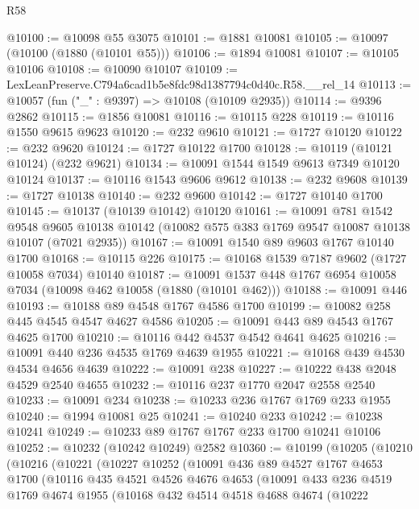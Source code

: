 \begin{lexlean}{R58}
\begin{coremodule}
@10100 := @10098 @55 @3075
@10101 := @1881 @10081
@10105 := @10097 (@10100 (@1880 (@10101 @55)))
@10106 := @1894 @10081
@10107 := @10105 @10106
@10108 := @10090 @10107
@10109 := LexLeanPreserve.C794a6cad1b5e8fdc98d1387794c0d40c.R58.__rel_14
@10113 := @10057 (fun ("_" : @9397) => @10108 (@10109 @2935))
@10114 := @9396 @2862
@10115 := @1856 @10081
@10116 := @10115 @228
@10119 := @10116 @1550 @9615 @9623
@10120 := @232 @9610
@10121 := @1727 @10120
@10122 := @232 @9620
@10124 := @1727 @10122 @1700
@10128 := @10119 (@10121 @10124) (@232 @9621)
@10134 := @10091 @1544 @1549 @9613 @7349 @10120 @10124
@10137 := @10116 @1543 @9606 @9612
@10138 := @232 @9608
@10139 := @1727 @10138
@10140 := @232 @9600
@10142 := @1727 @10140 @1700
@10145 := @10137 (@10139 @10142) @10120
@10161 := @10091
    @781
    @1542
    @9548
    @9605
    @10138
    @10142
    (@10082 @575 @383 @1769 @9547 @10087 @10138 @10107 (@7021 @2935))
@10167 := @10091 @1540 @89 @9603 @1767 @10140 @1700
@10168 := @10115 @226
@10175 := @10168 @1539 @7187 @9602 (@1727 @10058 @7034) @10140
@10187 := @10091 @1537 @448 @1767 @6954 @10058 @7034 (@10098 @462 @10058 (@1880 (@10101 @462)))
@10188 := @10091 @446
@10193 := @10188 @89 @4548 @1767 @4586 @1700
@10199 := @10082 @258 @445 @4545 @4547 @4627 @4586
@10205 := @10091 @443 @89 @4543 @1767 @4625 @1700
@10210 := @10116 @442 @4537 @4542 @4641 @4625
@10216 := @10091 @440 @236 @4535 @1769 @4639 @1955
@10221 := @10168 @439 @4530 @4534 @4656 @4639
@10222 := @10091 @238
@10227 := @10222 @438 @2048 @4529 @2540 @4655
@10232 := @10116 @237 @1770 @2047 @2558 @2540
@10233 := @10091 @234
@10238 := @10233 @236 @1767 @1769 @233 @1955
@10240 := @1994 @10081 @25
@10241 := @10240 @233
@10242 := @10238 @10241
@10249 := @10233 @89 @1767 @1767 @233 @1700 @10241 @10106
@10252 := @10232 (@10242 @10249) @2582
@10360 := @10199
    (@10205
      (@10210
        (@10216
          (@10221
            (@10227
              @10252
              (@10091
                @436
                @89
                @4527
                @1767
                @4653
                @1700
                (@10116
                  @435
                  @4521
                  @4526
                  @4676
                  @4653
                  (@10091
                    @433
                    @236
                    @4519
                    @1769
                    @4674
                    @1955
                    (@10168
                      @432
                      @4514
                      @4518
                      @4688
                      @4674
                      (@10222

\end{coremodule}
\end{lexlean}
